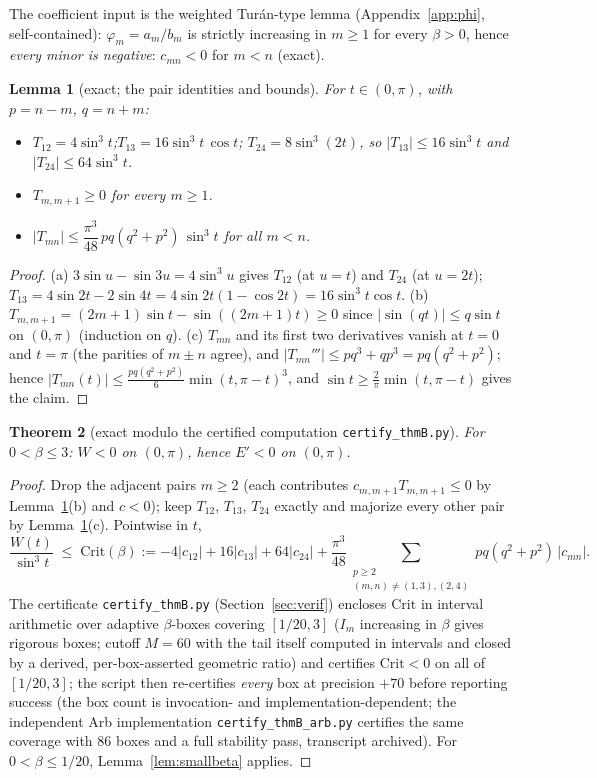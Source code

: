 \documentclass[11pt]{article}
\newtheorem{theorem}{Theorem}
\newtheorem{lemma}[theorem]{Lemma}
\theoremstyle{remark}
\begin{document}
The coefficient input is the weighted Tur\'an-type lemma
(Appendix~\ref{app:phi}, self-contained): $\varphi_m=a_m/b_m$ is strictly
increasing in $m\ge1$ for every $\beta>0$, hence \emph{every minor is
negative}: $c_{mn}<0$ for $m<n$ (exact).

\begin{lemma}[exact; the pair identities and bounds]\label{lem:pairs}
For $t\in(0,\pi)$, with $p=n-m$, $q=n+m$:
\begin{itemize}
\item[(a)] $T_{12}=4\sin^3t$;\quad $T_{13}=16\sin^3t\,\cos t$;\quad
$T_{24}=8\sin^3(2t)$, so $|T_{13}|\le16\sin^3t$ and
$|T_{24}|\le64\sin^3t$.
\item[(b)] $T_{m,m+1}\ge0$ for every $m\ge1$.
\item[(c)] $|T_{mn}|\le\dfrac{\pi^3}{48}\,pq(q^2+p^2)\,\sin^3t$ for all
$m<n$.
\end{itemize}
\end{lemma}

\begin{proof}
(a) $3\sin u-\sin3u=4\sin^3u$ gives $T_{12}$ (at $u=t$) and $T_{24}$ (at
$u=2t$); $T_{13}=4\sin2t-2\sin4t=4\sin2t(1-\cos2t)=16\sin^3t\cos t$.
(b) $T_{m,m+1}=(2m+1)\sin t-\sin((2m+1)t)\ge0$ since
$|\sin(qt)|\le q\sin t$ on $(0,\pi)$ (induction on $q$).
(c) $T_{mn}$ and its first two derivatives vanish at $t=0$ and $t=\pi$
(the parities of $m\pm n$ agree), and $|T_{mn}'''|\le
pq^3+qp^3=pq(q^2+p^2)$; hence
$|T_{mn}(t)|\le\frac{pq(q^2+p^2)}{6}\min(t,\pi-t)^3$, and
$\sin t\ge\frac2\pi\min(t,\pi-t)$ gives the claim.
\end{proof}

\begin{theorem}[exact modulo the certified computation
\texttt{certify\_thmB.py}]\label{thm:B}
For $0<\beta\le3$:\; $W<0$ on $(0,\pi)$, hence $E'<0$ on $(0,\pi)$.
\end{theorem}

\begin{proof}
Drop the adjacent pairs $m\ge2$ (each contributes $c_{m,m+1}T_{m,m+1}
\le0$ by Lemma~\ref{lem:pairs}(b) and $c<0$); keep $T_{12}$, $T_{13}$,
$T_{24}$ exactly and majorize every other pair by
Lemma~\ref{lem:pairs}(c). Pointwise in $t$,
\[
\frac{W(t)}{\sin^3t}\;\le\;\mathrm{Crit}(\beta):=
-4|c_{12}|+16|c_{13}|+64|c_{24}|
+\frac{\pi^3}{48}\!\!\sum_{\substack{p\ge2\\(m,n)\ne(1,3),(2,4)}}\!\!
pq(q^2+p^2)\,|c_{mn}| .
\]
The certificate \texttt{certify\_thmB.py} (Section~\ref{sec:verif})
encloses $\mathrm{Crit}$ in interval arithmetic over adaptive
$\beta$-boxes covering $[1/20,3]$ ($I_m$ increasing in $\beta$ gives
rigorous boxes; cutoff $M=60$ with the tail itself computed in
intervals and closed by a derived, per-box-asserted geometric ratio) and
certifies $\mathrm{Crit}<0$ on all of $[1/20,3]$; the
script then re-certifies \emph{every} box at precision $+70$ before
reporting success (the box count is invocation- and implementation-dependent; the
independent Arb implementation \texttt{certify\_thmB\_arb.py} certifies
the same coverage with $86$ boxes and a full stability pass, transcript
archived). For $0<\beta\le1/20$, Lemma~\ref{lem:smallbeta} applies.
\end{proof}
\end{document}
